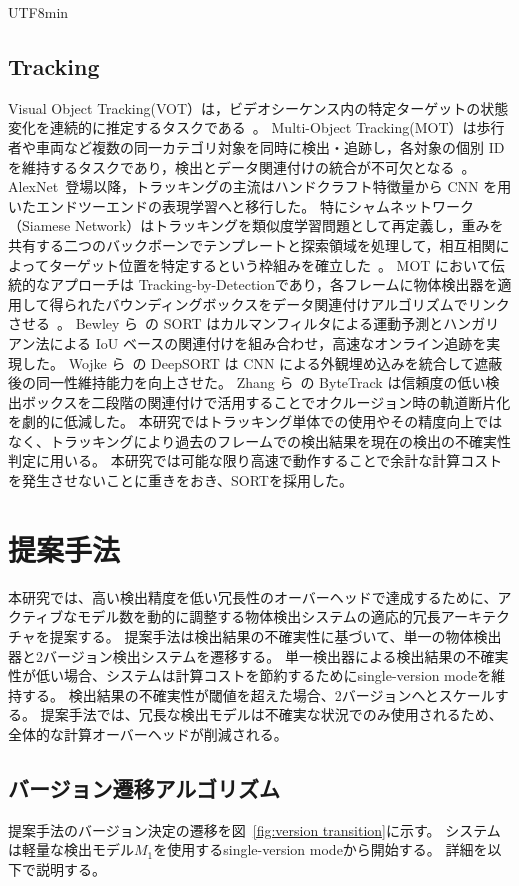 \documentclass[conference, dvipdfmx]{IEEEtran}
\begin{document}
\begin{CJK}{UTF8}{min}
\subsection{Tracking}
Visual Object Tracking(VOT）は，ビデオシーケンス内の特定ターゲットの状態変化を連続的に推定するタスクである~\cite{VOT_survey}。
Multi-Object Tracking(MOT）は歩行者や車両など複数の同一カテゴリ対象を同時に検出・追跡し，各対象の個別 ID を維持するタスクであり，検出とデータ関連付けの統合が不可欠となる~\cite{MOT_review}。
AlexNet~\cite{AlexNet}登場以降，トラッキングの主流はハンドクラフト特徴量から CNN を用いたエンドツーエンドの表現学習へと移行した。
特にシャムネットワーク（Siamese Network）はトラッキングを類似度学習問題として再定義し，重みを共有する二つのバックボーンでテンプレートと探索領域を処理して，相互相関によってターゲット位置を特定するという枠組みを確立した~\cite{bertinetto2021fullyconvolutionalsiamesenetworksobject}。
MOT において伝統的なアプローチは Tracking-by-Detectionであり，各フレームに物体検出器を適用して得られたバウンディングボックスをデータ関連付けアルゴリズムでリンクさせる~\cite{MOT_review}。
Bewley ら~\cite{SORT}の SORT はカルマンフィルタによる運動予測とハンガリアン法による IoU ベースの関連付けを組み合わせ，高速なオンライン追跡を実現した。
Wojke ら~\cite{DeepSort}の DeepSORT は CNN による外観埋め込みを統合して遮蔽後の同一性維持能力を向上させた。
Zhang ら~\cite{ByteTrack}の ByteTrack は信頼度の低い検出ボックスを二段階の関連付けで活用することでオクルージョン時の軌道断片化を劇的に低減した。
本研究ではトラッキング単体での使用やその精度向上ではなく、トラッキングにより過去のフレームでの検出結果を現在の検出の不確実性判定に用いる。
本研究では可能な限り高速で動作することで余計な計算コストを発生させないことに重きをおき、SORTを採用した。

\section{提案手法}
\label{sec:adrod}
本研究では、高い検出精度を低い冗長性のオーバーヘッドで達成するために、アクティブなモデル数を動的に調整する物体検出システムの適応的冗長アーキテクチャを提案する。
提案手法は検出結果の不確実性に基づいて、単一の物体検出器と2バージョン検出システムを遷移する。
単一検出器による検出結果の不確実性が低い場合、システムは計算コストを節約するためにsingle-version modeを維持する。
検出結果の不確実性が閾値を超えた場合、2バージョンへとスケールする。
提案手法では、冗長な検出モデルは不確実な状況でのみ使用されるため、全体的な計算オーバーヘッドが削減される。

\subsection{バージョン遷移アルゴリズム}
提案手法のバージョン決定の遷移を図~\ref{fig:version transition}に示す。
システムは軽量な検出モデル$M_1$を使用するsingle-version modeから開始する。
詳細を以下で説明する。


\end{CJK}
\end{document}
